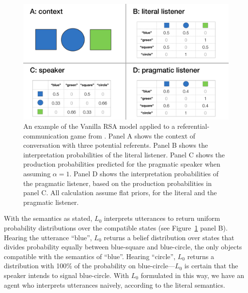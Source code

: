\documentclass{sp}
\begin{document}
\begin{figure}[t]
\centering
\includegraphics[width=\textwidth]{RefGame-example.pdf}
\caption{An example of the Vanilla RSA model applied to a referential-communication game from \cite{frankgoodman2012}. Panel A shows the context of conversation with three potential referents. Panel B shows the interpretation probabilities of the literal listener. Panel C shows the production probabilities predicted for the pragmatic speaker when assuming $\alpha = 1$. Panel D shows the interpretation probabilities of the pragmatic listener, based on the production probabilities in panel C. All calculation assume flat priors, for the literal and the pragmatic listener.}
\label{ref-game}
\end{figure}

With the semantics as stated, $L_0$ interprets utterances to return uniform probability distributions over the compatible states (see Figure~\ref{ref-game} panel B). Hearing the utterance ``blue'', $L_0$ returns a belief distribution over states that divides probability equally between blue-square and blue-circle, the only objects compatible with the semantics of ``blue''. Hearing ``circle'', $L_0$ returns a distribution with 100\% of the probability on blue-circle---$L_0$ is certain that the speaker intends to signal blue-circle. With $L_0$ formulated in this way, we have an agent who interprets utterances naively, according to the literal semantics.
\end{document}
